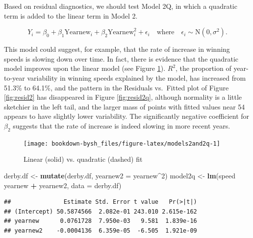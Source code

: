 \documentclass[
]{krantz}
\newenvironment{Shaded}{\begin{snugshade}}{\end{snugshade}}
\newcommand{\DataTypeTok}[1]{\textcolor[rgb]{0.27,0.27,0.27}{#1}}
\newcommand{\DecValTok}[1]{\textcolor[rgb]{0.06,0.06,0.06}{#1}}
\newcommand{\KeywordTok}[1]{\textcolor[rgb]{0.27,0.27,0.27}{\textbf{#1}}}
\newcommand{\NormalTok}[1]{#1}
\newcommand{\OperatorTok}[1]{\textcolor[rgb]{0.43,0.43,0.43}{\textbf{#1}}}
\newcommand{\StringTok}[1]{\textcolor[rgb]{0.5,0.5,0.5}{#1}}
\begin{document}
Based on residual diagnostics, we should test Model 2Q, in which a quadratic term is added to the linear term in Model 2.

\begin{equation*}
Y_{i}=\beta_{0}+\beta_{1}\textrm{Yearnew}_{i}+\beta_{2}\textrm{Yearnew}^2_{i}+\epsilon_{i}\quad \textrm{where}\quad \epsilon_{i}\sim \textrm{N}(0,\sigma^2).
\end{equation*}

This model could suggest, for example, that the rate of increase in winning speeds is slowing down over time. In fact, there is evidence that the quadratic model improves upon the linear model (see Figure \ref{fig:models2and2q}). \(R^2\),  the proportion of year-to-year variability in winning speeds explained by the model, has increased from 51.3\% to 64.1\%, and the pattern in the Residuals vs.~Fitted plot of Figure \ref{fig:resid2} has disappeared in Figure \ref{fig:resid2q}, although normality is a little sketchier in the left tail, and the larger mass of points with fitted values near 54 appears to have slightly lower variability. The significantly negative coefficient for \(\beta_{2}\) suggests that the rate of increase is indeed slowing in more recent years.

\begin{figure}

{\centering \texttt{[image: bookdown-bysh\_files/figure-latex/models2and2q-1]} 

}

\caption{Linear (solid) vs. quadratic (dashed) fit}\label{fig:models2and2q}
\end{figure}

\begin{Shaded}
\begin{Highlighting}[]
\NormalTok{derby.df <-}\StringTok{ }\KeywordTok{mutate}\NormalTok{(derby.df, }\DataTypeTok{yearnew2 =}\NormalTok{ yearnew}\OperatorTok{^}\DecValTok{2}\NormalTok{)}
\NormalTok{model2q <-}\StringTok{ }\KeywordTok{lm}\NormalTok{(speed }\OperatorTok{~}\StringTok{ }\NormalTok{yearnew }\OperatorTok{+}\StringTok{ }\NormalTok{yearnew2, }\DataTypeTok{data =}\NormalTok{ derby.df)}
\end{Highlighting}
\end{Shaded}

\begin{verbatim}
##               Estimate Std. Error t value   Pr(>|t|)
## (Intercept) 50.5874566  2.082e-01 243.010 2.615e-162
## yearnew      0.0761728  7.950e-03   9.581  1.839e-16
## yearnew2    -0.0004136  6.359e-05  -6.505  1.921e-09
\end{verbatim}
\end{document}
